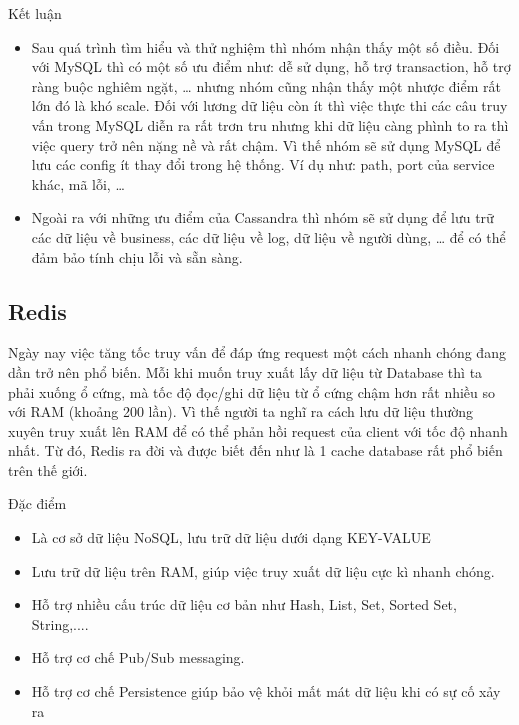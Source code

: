 \begin{itemize}
            Kết luận
            
            \begin{itemize}
                \item Sau quá trình tìm hiểu và thử nghiệm thì nhóm nhận thấy một số điều. Đối với MySQL thì có một số ưu điểm như: dễ sử dụng, hỗ trợ transaction, hỗ trợ ràng buộc nghiêm ngặt, … nhưng nhóm cũng nhận thấy một nhược điểm rất lớn đó là khó scale. Đối với lương dữ liệu còn ít thì việc thực thi các câu truy vấn trong MySQL diễn ra rất trơn tru nhưng khi dữ liệu càng phình to ra thì việc query trở nên nặng nề và rất chậm. Vì thế nhóm sẽ sử dụng MySQL để lưu các config ít thay đổi trong hệ thống. Ví dụ như: path, port của service khác, mã lỗi, …
                \item Ngoài ra với những ưu điểm của Cassandra thì nhóm sẽ sử dụng để lưu trữ các dữ liệu về business, các dữ liệu về log, dữ liệu về người dùng, … để có thể đảm bảo tính chịu lỗi và sẵn sàng.
            \end{itemize}
            \subsection{Redis}
            
            Ngày nay việc tăng tốc truy vấn để đáp ứng request một cách nhanh chóng đang dần trở nên phổ biến. Mỗi khi muốn truy xuất lấy dữ liệu từ Database thì ta phải xuống ổ cứng, mà tốc độ đọc/ghi dữ liệu từ ổ cứng chậm hơn rất nhiều so với RAM (khoảng 200 lần). Vì thế người ta nghĩ ra cách lưu dữ liệu thường xuyên truy xuất lên RAM để có thể phản hồi request của client với tốc độ nhanh nhất. Từ đó, Redis ra đời và được biết đến như là 1 cache database rất phổ biến trên thế giới.
            
            Đặc điểm
            
            \begin{itemize}
                \item Là cơ sở dữ liệu NoSQL, lưu trữ dữ liệu dưới dạng KEY-VALUE
                \item Lưu trữ dữ liệu trên RAM, giúp việc truy xuất dữ liệu cực kì nhanh chóng.
                \item Hỗ trợ nhiều cấu trúc dữ liệu cơ bản như Hash, List, Set, Sorted Set, String,....
                \item Hỗ trợ cơ chế Pub/Sub messaging.
                \item Hỗ trợ cơ chế Persistence giúp bảo vệ khỏi mất mát dữ liệu khi có sự cố xảy ra
            \end{itemize}
            

\end{itemize}

